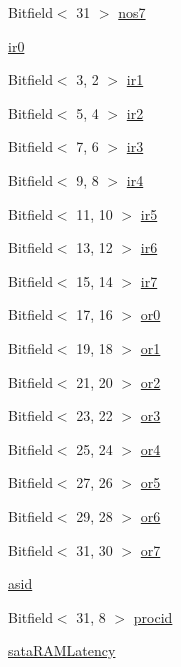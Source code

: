 \begin{DoxyCompactItemize}
\item 
Bitfield$<$ 31 $>$ \hyperlink{namespaceArmISA_a34bb88ef6be03bea5a9754327f93033f}{nos7}
\item 
\hyperlink{namespaceArmISA_a92bbf070b9117fff24a158cc72e10f06}{ir0}
\item 
Bitfield$<$ 3, 2 $>$ \hyperlink{namespaceArmISA_a8bfb6480cf126b84c0d52a5ad85e13ec}{ir1}
\item 
Bitfield$<$ 5, 4 $>$ \hyperlink{namespaceArmISA_af95e9d695f2d34b68283d18cd6e8b4a2}{ir2}
\item 
Bitfield$<$ 7, 6 $>$ \hyperlink{namespaceArmISA_aef407f337e63d1d256530daaedf9732f}{ir3}
\item 
Bitfield$<$ 9, 8 $>$ \hyperlink{namespaceArmISA_ac57ee1a890531d53b69909f04de752b2}{ir4}
\item 
Bitfield$<$ 11, 10 $>$ \hyperlink{namespaceArmISA_aa762f55234c6638c095801c6e93d0033}{ir5}
\item 
Bitfield$<$ 13, 12 $>$ \hyperlink{namespaceArmISA_a0d5dc3d0beedd041e780ea4774676675}{ir6}
\item 
Bitfield$<$ 15, 14 $>$ \hyperlink{namespaceArmISA_a236ac0fa640d018b50727c9af77edc42}{ir7}
\item 
Bitfield$<$ 17, 16 $>$ \hyperlink{namespaceArmISA_a82526da33d56eb88821057eb6d86647a}{or0}
\item 
Bitfield$<$ 19, 18 $>$ \hyperlink{namespaceArmISA_a5589e7025886cfbd06c96ebc6e1c0e06}{or1}
\item 
Bitfield$<$ 21, 20 $>$ \hyperlink{namespaceArmISA_a76972eaae5f503a7065865a1e6184e6e}{or2}
\item 
Bitfield$<$ 23, 22 $>$ \hyperlink{namespaceArmISA_a554ba045c17f1f24d1a7539c3bd640e8}{or3}
\item 
Bitfield$<$ 25, 24 $>$ \hyperlink{namespaceArmISA_a2e7cc90a7b2db15a68de3686bc192916}{or4}
\item 
Bitfield$<$ 27, 26 $>$ \hyperlink{namespaceArmISA_abd5f1816b05bfd344a1da08bb3a29924}{or5}
\item 
Bitfield$<$ 29, 28 $>$ \hyperlink{namespaceArmISA_afad6e40fcf7107110221b237bfaa6c5d}{or6}
\item 
Bitfield$<$ 31, 30 $>$ \hyperlink{namespaceArmISA_ac73e9a0f1621a313b84f75fa69f1bc13}{or7}
\item 
\hyperlink{namespaceArmISA_a92720268bdaf1e0e53fc66152af0ff18}{asid}
\item 
Bitfield$<$ 31, 8 $>$ \hyperlink{namespaceArmISA_a1896c971fd94d6960b4a67f4e1bb4417}{procid}
\item 
\hyperlink{namespaceArmISA_a6095ac02826a89736f64b46fbd358c2a}{sataRAMLatency}

\end{DoxyCompactItemize}
